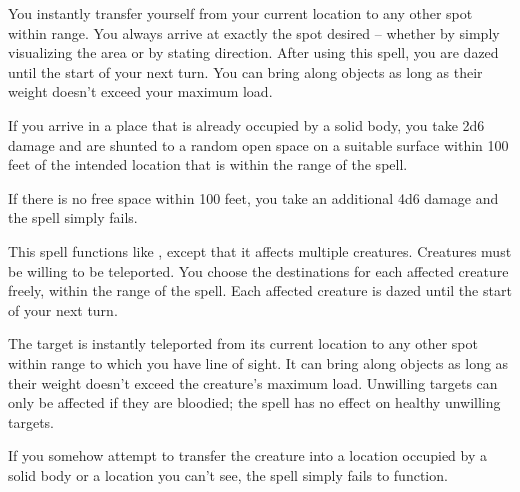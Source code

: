 \spellrng{\rngext}
\begin{spelleffect}
  You instantly transfer yourself from your current location to any other spot within range. You always arrive at exactly the spot desired -- whether by simply visualizing the area or by stating direction. After using this spell, you are dazed until the start of your next turn. You can bring along objects as long as their weight doesn't exceed your maximum load.
\end{spelleffect}
\begin{spellnotes}
  \par If you arrive in a place that is already occupied by a solid body, you take 2d6 damage and are shunted to a random open space on a suitable surface within 100 feet of the intended location that is within the range of the spell.
  \par  If there is no free space within 100 feet, you take an additional 4d6 damage and the spell simply fails.
\end{spellnotes}

\begin{spelleffect}
  This spell functions like , except that it affects multiple creatures. Creatures must be willing to be teleported. You choose the destinations for each affected creature freely, within the range of the spell. Each affected creature is dazed until the start of your next turn.
\end{spelleffect}

\spellrng{\rngclose}
\begin{spelleffect}
    The target is instantly teleported from its current location to any other spot within range to which you have line of sight. It can bring along objects as long as their weight doesn't exceed the creature's maximum load. Unwilling targets can only be affected if they are bloodied; the spell has no effect on healthy unwilling targets.
\end{spelleffect}
\begin{spellnotes}
    If you somehow attempt to transfer the creature into a location occupied by a solid body or a location you can't see, the spell simply fails to function.
\end{spellnotes}

